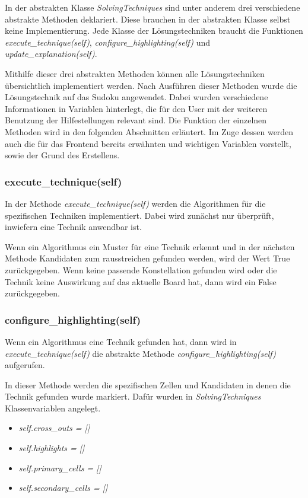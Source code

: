 In der abstrakten Klasse \textit{SolvingTechniques} sind unter anderem drei verschiedene abstrakte Methoden deklariert. Diese brauchen in der abstrakten Klasse selbst keine Implementierung. Jede Klasse der Lösungstechniken braucht die Funktionen \textit{execute\_technique(self)}, \textit{configure\_highlighting(self)} und \textit{update\_explanation(self)}.

Mithilfe dieser drei abstrakten Methoden können alle Lösungstechniken übersichtlich implementiert werden. Nach Ausführen dieser Methoden wurde die Lösungstechnik auf das Sudoku angewendet. Dabei  wurden verschiedene Informationen in Variablen hinterlegt, die für den User mit der weiteren Benutzung der Hilfestellungen relevant sind.
Die Funktion der einzelnen Methoden wird in den folgenden Abschnitten erläutert. Im Zuge dessen werden auch die für das Frontend bereits erwähnten und wichtigen Variablen vorstellt, sowie der Grund des Erstellens.

\subsubsection{execute\_technique(self)}
In der Methode \textit{execute\_technique(self)} werden die Algorithmen für die spezifischen Techniken implementiert. Dabei wird zunächst nur überprüft, inwiefern eine Technik anwendbar ist. 

Wenn ein Algorithmus ein Muster für eine Technik erkennt und in der nächsten Methode Kandidaten zum rausstreichen gefunden werden, wird der Wert True zurückgegeben. Wenn keine passende Konstellation gefunden wird oder die Technik keine Auswirkung auf das aktuelle Board hat, dann wird ein False zurückgegeben.

\subsubsection{configure\_highlighting(self)}
Wenn ein Algorithmus eine Technik gefunden hat, dann wird in \textit{execute\_technique(self)} die abstrakte Methode 
\textit{configure\_highlighting(self)} aufgerufen. 

In dieser Methode werden die spezifischen Zellen und Kandidaten in denen die Technik gefunden wurde markiert. Dafür wurden in \textit{SolvingTechniques} Klassenvariablen angelegt. 
\begin{itemize}
	\item \textit{self.cross\_outs = []}
	\item \textit{self.highlights = []}
	\item \textit{self.primary\_cells = []}
	\item \textit{self.secondary\_cells = []}
\end{itemize}

